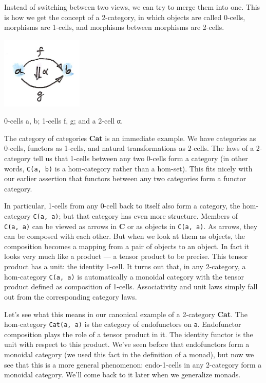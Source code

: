 Instead of switching between two views, we can try to merge them into
one. This is how we get the concept of a 2-category, in which objects
are called 0-cells, morphisms are 1-cells, and morphisms between
morphisms are 2-cells.

\hypertarget{attachment_9117}{}
\includegraphics[width=1.53125in]{images/twocat.png}

0-cells a, b; 1-cells f, g; and a 2-cell α.

The category of categories \textbf{Cat} is an immediate example. We have
categories as 0-cells, functors as 1-cells, and natural transformations
as 2-cells. The laws of a 2-category tell us that 1-cells between any
two 0-cells form a category (in other words, \texttt{C(a,\ b)} is a
hom-category rather than a hom-set). This fits nicely with our earlier
assertion that functors between any two categories form a functor
category.

In particular, 1-cells from any 0-cell back to itself also form a
category, the hom-category \texttt{C(a,\ a)}; but that category has even
more structure. Members of \texttt{C(a,\ a)} can be viewed as arrows in
\textbf{C} or as objects in \texttt{C(a,\ a)}. As arrows, they can be
composed with each other. But when we look at them as objects, the
composition becomes a mapping from a pair of objects to an object. In
fact it looks very much like a product --- a tensor product to be
precise. This tensor product has a unit: the identity 1-cell. It turns
out that, in any 2-category, a hom-category \texttt{C(a,\ a)} is
automatically a monoidal category with the tensor product defined as
composition of 1-cells. Associativity and unit laws simply fall out from
the corresponding category laws.

Let's see what this means in our canonical example of a 2-category
\textbf{Cat}. The hom-category \texttt{Cat(a,\ a)} is the category of
endofunctors on \texttt{a}. Endofunctor composition plays the role of a
tensor product in it. The identity functor is the unit with respect to
this product. We've seen before that endofunctors form a monoidal
category (we used this fact in the definition of a monad), but now we
see that this is a more general phenomenon: endo-1-cells in any
2-category form a monoidal category. We'll come back to it later when we
generalize monads.

